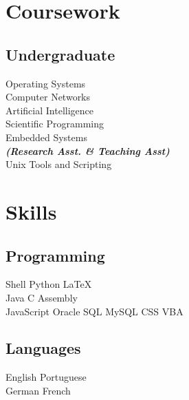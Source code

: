 \documentclass[a4paper]{deedy-resume} %
\begin{document}
\begin{minipage}[t]{0.33\textwidth}
\sectionspace %


\section{Coursework}

\subsection{Undergraduate}

Operating Systems \\
Computer Networks \\
Artificial Intelligence \\
Scientific Programming \\
Embedded  Systems \\
{\footnotesize \textit{\textbf{(Research Asst. \& Teaching Asst) }}} \\
Unix Tools and Scripting

\sectionspace %


\section{Skills}

\subsection{Programming}

Shell \textbullet{}  Python \textbullet{} \LaTeX\ \\ 
Java \textbullet{} C \textbullet{} Assembly \\
JavaScript \textbullet{} Oracle SQL \textbullet{} MySQL \textbullet{} CSS \textbullet{} VBA

\sectionspace %

\subsection{Languages}

English \textbullet{}  Portuguese  \\ 
German \textbullet{} French \\


\sectionspace %

\end{minipage} %
\end{document}
